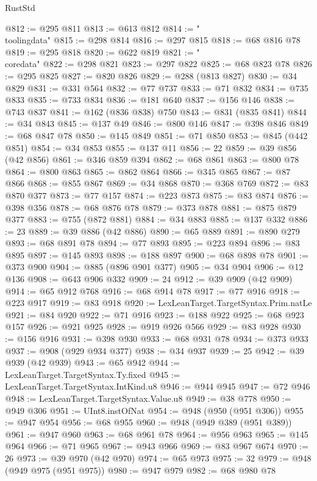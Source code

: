 \begin{lexlean}{RustStd}
\begin{coremodule}
{\begin{coremodule}
{{{{{{{{{{{{{{{{{{{{{{{{{{{{{{{{{{{@812 := @295 @811
@813 := @613 @812
@814 := "\\toolingdata"
@815 := @298 @814
@816 := @297 @815
@818 := @68 @816 @78
@819 := @295 @818
@820 := @622 @819
@821 := "\\coredata"
@822 := @298 @821
@823 := @297 @822
@825 := @68 @823 @78
@826 := @295 @825
@827 := @820 @826
@829 := @288 (@813 @827)
@830 := @34 @829
@831 := @331 @564
@832 := @77 @737
@833 := @71 @832
@834 := @735 @833
@835 := @733 @834
@836 := @181 @640
@837 := @156 @146
@838 := @743 @837
@841 := @162 (@836 @838) @750
@843 := @831 (@835 @841)
@844 := @34 @843
@845 := @137 @49
@846 := @800 @146
@847 := @398 @846
@849 := @68 @847 @78
@850 := @145 @849
@851 := @71 @850
@853 := @845 (@442 @851)
@854 := @34 @853
@855 := @137 @11
@856 := 22
@859 := @39 @856 (@42 @856)
@861 := @346 @859 @394
@862 := @68 @861
@863 := @800 @78
@864 := @800 @863
@865 := @862 @864
@866 := @345 @865
@867 := @87 @866
@868 := @855 @867
@869 := @34 @868
@870 := @368 @769
@872 := @83 @870 @377
@873 := @77 @157
@874 := @223 @873
@875 := @83 @874
@876 := @398 @356
@878 := @68 @876 @78
@879 := @373 @878
@881 := @875 @879 @377
@883 := @755 (@872 @881)
@884 := @34 @883
@885 := @137 @332
@886 := 23
@889 := @39 @886 (@42 @886)
@890 := @65 @889
@891 := @890 @279
@893 := @68 @891 @78
@894 := @77 @893
@895 := @223 @894
@896 := @83 @895
@897 := @145 @893
@898 := @188 @897
@900 := @68 @898 @78
@901 := @373 @900
@904 := @885 (@896 @901 @377)
@905 := @34 @904
@906 := @12 @136
@908 := @643 @906 @332
@909 := 24
@912 := @39 @909 (@42 @909)
@914 := @65 @912 @768
@916 := @68 @914 @78
@917 := @77 @916
@918 := @223 @917
@919 := @83 @918
@920 := LexLeanTarget.TargetSyntax.Prim.natLe
@921 := @84 @920
@922 := @71 @916
@923 := @188 @922
@925 := @68 @923 @157
@926 := @921 @925
@928 := @919 @926 @566
@929 := @83 @928
@930 := @156 @916
@931 := @398 @930
@933 := @68 @931 @78
@934 := @373 @933
@937 := @908 (@929 @934 @377)
@938 := @34 @937
@939 := 25
@942 := @39 @939 (@42 @939)
@943 := @65 @942
@944 := LexLeanTarget.TargetSyntax.Ty.fixed
@945 := LexLeanTarget.TargetSyntax.IntKind.u8
@946 := @944 @945
@947 := @72 @946
@948 := LexLeanTarget.TargetSyntax.Value.u8
@949 := @38 @778
@950 := @949 @306
@951 := UInt8.instOfNat
@954 := @948 (@950 (@951 @306))
@955 := @947 @954
@956 := @68 @955
@960 := @948 (@949 @389 (@951 @389))
@961 := @947 @960
@963 := @68 @961 @78
@964 := @956 @963
@965 := @145 @964
@966 := @71 @965
@967 := @943 @966
@969 := @83 @967 @674
@970 := 26
@973 := @39 @970 (@42 @970)
@974 := @65 @973
@975 := 32
@979 := @948 (@949 @975 (@951 @975))
@980 := @947 @979
@982 := @68 @980 @78
}}}}}}}}}}}}}}}}}}}}}}}}}}}}}}}}}}}
\end{coremodule}}
\end{coremodule}
\end{lexlean}
